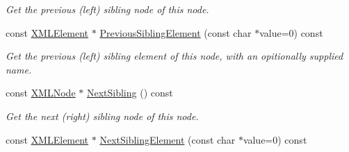 \begin{DoxyCompactItemize}
\begin{DoxyCompactList}\small\item\em Get the previous (left) sibling node of this node. \end{DoxyCompactList}\item 
\hypertarget{classtinyxml2_1_1_x_m_l_node_a020bb1a46d6e5901aa7d1949d5595d77}{const \hyperlink{classtinyxml2_1_1_x_m_l_element}{X\-M\-L\-Element} $\ast$ \hyperlink{classtinyxml2_1_1_x_m_l_node_a020bb1a46d6e5901aa7d1949d5595d77}{Previous\-Sibling\-Element} (const char $\ast$value=0) const }\label{classtinyxml2_1_1_x_m_l_node_a020bb1a46d6e5901aa7d1949d5595d77}

\begin{DoxyCompactList}\small\item\em Get the previous (left) sibling element of this node, with an opitionally supplied name. \end{DoxyCompactList}\item 
\hypertarget{classtinyxml2_1_1_x_m_l_node_ac95ff4ae0a6a40300e6bf3d80a15b528}{const \hyperlink{classtinyxml2_1_1_x_m_l_node}{X\-M\-L\-Node} $\ast$ \hyperlink{classtinyxml2_1_1_x_m_l_node_ac95ff4ae0a6a40300e6bf3d80a15b528}{Next\-Sibling} () const }\label{classtinyxml2_1_1_x_m_l_node_ac95ff4ae0a6a40300e6bf3d80a15b528}

\begin{DoxyCompactList}\small\item\em Get the next (right) sibling node of this node. \end{DoxyCompactList}\item 
\hypertarget{classtinyxml2_1_1_x_m_l_node_a2762f4249bfd3362324fe07c87418a88}{const \hyperlink{classtinyxml2_1_1_x_m_l_element}{X\-M\-L\-Element} $\ast$ \hyperlink{classtinyxml2_1_1_x_m_l_node_a2762f4249bfd3362324fe07c87418a88}{Next\-Sibling\-Element} (const char $\ast$value=0) const }\label{classtinyxml2_1_1_x_m_l_node_a2762f4249bfd3362324fe07c87418a88}


\end{DoxyCompactItemize}
